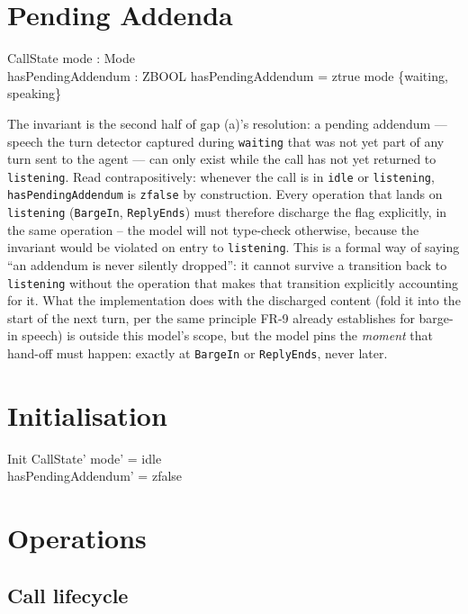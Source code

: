 \documentclass[a4paper,10pt,fleqn]{article}
\begin{document}
\section{Pending Addenda}
\label{sec:addendum}

\begin{schema}{CallState}
  mode : Mode \\
  hasPendingAddendum : ZBOOL
  \where
  hasPendingAddendum = ztrue \implies mode \in \{waiting, speaking\}
\end{schema}

The invariant is the second half of gap (a)'s resolution: a pending addendum
--- speech the turn detector captured during \texttt{waiting} that was not
yet part of any turn sent to the agent --- can only exist while the call has
not yet returned to \texttt{listening}. Read contrapositively: whenever the
call is in \texttt{idle} or \texttt{listening}, \texttt{hasPendingAddendum}
is \texttt{zfalse} by construction. Every operation that lands on
\texttt{listening} (\texttt{BargeIn}, \texttt{ReplyEnds}) must therefore
discharge the flag explicitly, in the same operation -- the model will not
type-check otherwise, because the invariant would be violated on entry to
\texttt{listening}. This is a formal way of saying ``an addendum is never
silently dropped'': it cannot survive a transition back to
\texttt{listening} without the operation that makes that transition
explicitly accounting for it. What the implementation does with the
discharged content (fold it into the start of the next turn, per the same
principle FR-9 already establishes for barge-in speech) is outside this
model's scope, but the model pins the \emph{moment} that hand-off must
happen: exactly at \texttt{BargeIn} or \texttt{ReplyEnds}, never later.

\section{Initialisation}

\begin{schema}{Init}
  CallState'
  \where
  mode' = idle \\
  hasPendingAddendum' = zfalse
\end{schema}

\section{Operations}

\subsection{Call lifecycle}
\end{document}
